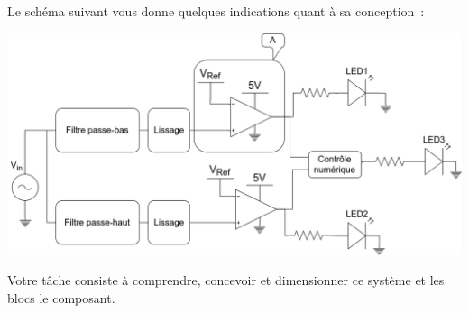 \documentclass{../template/tp}
\begin{document}
Le schéma suivant vous donne quelques indications quant à sa conception~:

\begin{center}
\includegraphics[width=\textwidth]{elech301_schema-bloc_mystere.png}
\end{center}

Votre tâche consiste à comprendre, concevoir et dimensionner ce système et les blocs le composant.
\end{document}

